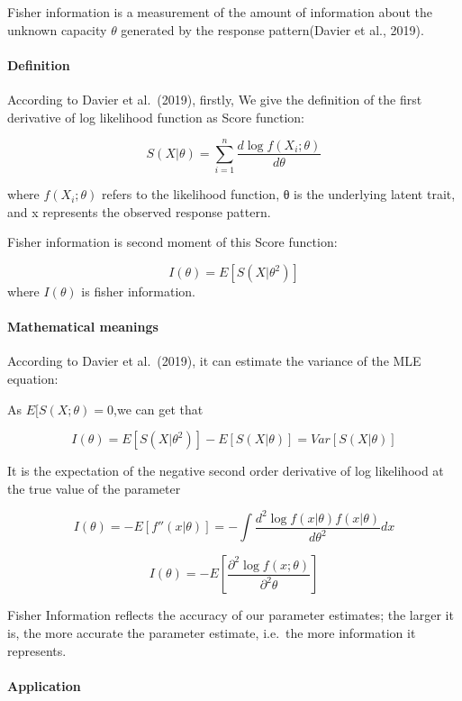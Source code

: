 \documentclass[
]{article}
\begin{document}
Fisher information is a measurement of the amount of information about
the unknown capacity \(\theta\) generated by the response pattern(Davier
et al., 2019).

\hypertarget{definition-1}{%
\paragraph{Definition}\label{definition-1}}

According to Davier et al.~(2019), firstly, We give the definition of
the first derivative of log likelihood function as Score function:

\[S(X|\theta)=\sum_{i=1}^n\frac{d\log f(X_i;\theta)}{d\theta}\]

where \(f(X_i;\theta)\) refers to the likelihood function, θ is the
underlying latent trait, and x represents the observed response pattern.

Fisher information is second moment of this Score function:

\[I(\theta)=E[S(X|\theta^2)]\] where \(I(\theta)\) is fisher
information.

\hypertarget{mathematical-meanings}{%
\paragraph{Mathematical meanings}\label{mathematical-meanings}}

According to Davier et al.~(2019), it can estimate the variance of the
MLE equation:

As \(E[S(X;\theta)=0\),we can get that

\[I(\theta)=E[S(X|\theta^2)]-E[S(X|\theta)]=Var[S(X|\theta)]\]

It is the expectation of the negative second order derivative of log
likelihood at the true value of the parameter

\[I(\theta)=-E[f''(x|\theta)]=-\int\frac{d^2\log f(x|\theta)f(x|\theta)}{d\theta^2} dx\]

\[I(\theta)=-E\left[\frac  {\partial^2 \log f(x;\theta)}{\partial^2 \theta} \right]\]

Fisher Information reflects the accuracy of our parameter estimates; the
larger it is, the more accurate the parameter estimate, i.e.~the more
information it represents.

\hypertarget{application}{%
\paragraph{Application}\label{application}}
\end{document}
